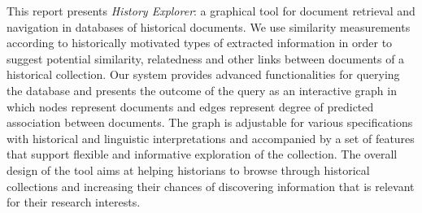 This report presents \emph{History Explorer}: a graphical tool for document retrieval and navigation in databases of historical documents. 
We use similarity measurements according to historically motivated types of extracted information in order to suggest potential similarity, relatedness and other links between documents of a historical collection. Our system provides advanced functionalities for querying the database and presents the outcome of the query as an interactive graph in which nodes represent documents and edges represent degree of predicted association between documents. The graph is adjustable for various specifications with historical and linguistic interpretations and accompanied by a set of features that support flexible and informative exploration of the collection. The overall design of the tool aims at helping historians to browse through historical collections and increasing their chances of discovering information that is relevant for their research interests. 



